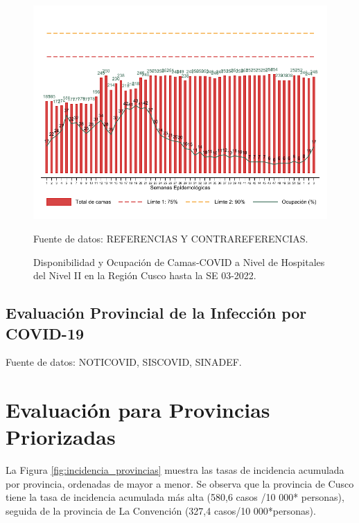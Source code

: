 \documentclass[12pt,a4paper,openany]{book}
\begin{document}
\begin{figure}[h]
	\caption{Disponibilidad y Ocupación de Camas-COVID a Nivel de Hospitales del Nivel II en la Región Cusco hasta la SE 03-2022.}\label{fig:ocupacion_2nivel}
	\begin{center}
		\includegraphics[width=0.95\linewidth]{../figuras/nivel_2.pdf}
	\end{center}
	{\footnotesize {Fuente de datos: REFERENCIAS Y CONTRAREFERENCIAS.}}
\end{figure}
\clearpage
\begin{landscape}
	
	\subsection*{Evaluación Provincial de la Infección por COVID-19} 
	
	
	
	
	{\footnotesize Fuente de datos: NOTICOVID, SISCOVID, SINADEF.}
	
	\noindent 
	
\end{landscape}


\clearpage

	\section*{Evaluación para Provincias Priorizadas}
\noindent La Figura \ref{fig:incidencia_provincias} muestra las tasas de incidencia acumulada por provincia, ordenadas de mayor a menor. Se observa que la provincia de Cusco tiene la tasa de incidencia acumulada más alta (580,6 casos /10 000* personas), seguida de la provincia de La Convención (327,4 casos/10 000*personas).
\end{document}
